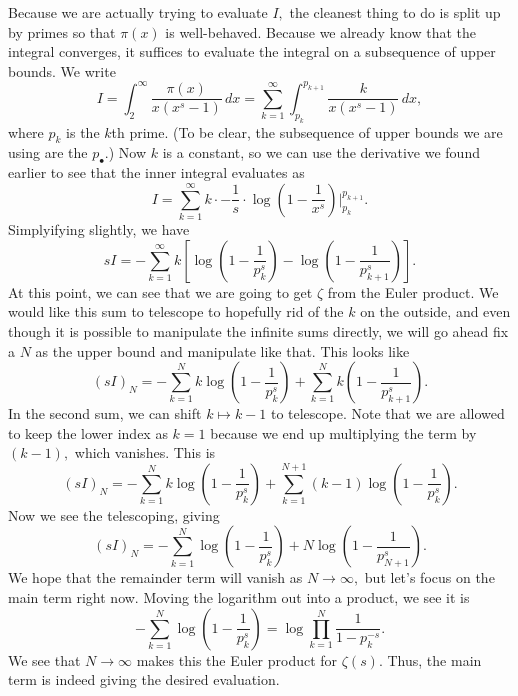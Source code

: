 Because we are actually trying to evaluate $I,$ the cleanest thing to do is split up by primes so that $\pi(x)$ is well-behaved. Because we already know that the integral converges, it suffices to evaluate the integral on a subsequence of upper bounds. We write
\[I=\int_2^\infty\frac{\pi(x)}{x\left(x^s-1\right)}\,dx=\sum_{k=1}^\infty\int_{p_k}^{p_{k+1}}\frac k{x\left(x^s-1\right)}\,dx,\]
where $p_k$ is the $k$th prime. (To be clear, the subsequence of upper bounds we are using are the $p_\bullet.$) Now $k$ is a constant, so we can use the derivative we found earlier to see that the inner integral evaluates as
\[I=\sum_{k=1}^\infty k\cdot-\frac1s\cdot\log\left(1-\frac1{x^s}\right)\bigg|_{p_k}^{p_{k+1}}.\]
Simplyifying slightly, we have
\[sI=-\sum_{k=1}^\infty k\left[\log\left(1-\frac1{p_k^s}\right)-\log\left(1-\frac1{p_{k+1}^s}\right)\right].\]
At this point, we can see that we are going to get $\zeta$ from the Euler product. We would like this sum to telescope to hopefully rid of the $k$ on the outside, and even though it is possible to manipulate the infinite sums directly, we will go ahead fix a $N$ as the upper bound and manipulate like that. This looks like
\[(sI)_N=-\sum_{k=1}^Nk\log\left(1-\frac1{p_k^s}\right)+\sum_{k=1}^Nk\left(1-\frac1{p_{k+1}^s}\right).\]
In the second sum, we can shift $k\mapsto k-1$ to telescope. Note that we are allowed to keep the lower index as $k=1$ because we end up multiplying the term by $(k-1),$ which vanishes. This is
\[(sI)_N=-\sum_{k=1}^Nk\log\left(1-\frac1{p_k^s}\right)+\sum_{k=1}^{N+1}(k-1)\log\left(1-\frac1{p_k^s}\right).\]
Now we see the telescoping, giving
\[(sI)_N=-\sum_{k=1}^N\log\left(1-\frac1{p_k^s}\right)+N\log\left(1-\frac1{p_{N+1}^s}\right).\]
We hope that the remainder term will vanish as $N\to\infty,$ but let's focus on the main term right now. Moving the logarithm out into a product, we see it is
\[-\sum_{k=1}^N\log\left(1-\frac1{p_k^s}\right)=\log\prod_{k=1}^N\frac1{1-p_k^{-s}}.\]
We see that $N\to\infty$ makes this the Euler product for $\zeta(s).$ Thus, the main term is indeed giving the desired evaluation.

